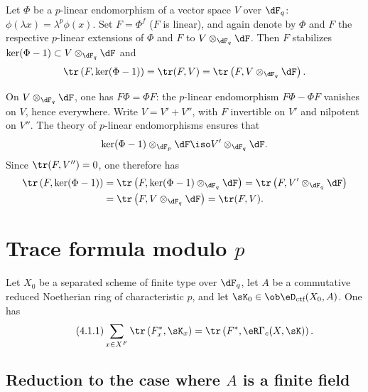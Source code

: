 \documentclass[oneside]{book}
\begin{document}
\begin{lemma_}\label{III:3-8}
Let $\Phi$ be a $p$-linear endomorphism of a vector space $V$ over
$\dF_q$: $\phi(\lambda x) = \lambda^p\phi(x)$. Set $F=\Phi^f$ ($F$ is
linear), and again denote by $\Phi$ and $F$ the respective $p$-linear
extensions of $\Phi$ and $F$ to $V\otimes_{\dF_q}\dF$. Then $F$ stabilizes
$\ker(\Phi-1)\subset V\otimes_{\dF_q}\dF$ and
\[
  \tr\left(F,\ker(\Phi-1)\right) = \tr(F,V) = \tr\left(F,V\otimes_{\dF_q}\dF\right) \text{.}
\]
\end{lemma_}

On $V\otimes_{\dF_q}\dF$, one has $F\Phi = \Phi F$: the $p$-linear
endomorphism $F\Phi-\Phi F$ vanishes on $V$, hence everywhere. Write
$V=V'+V''$, with $F$ invertible on $V'$ and nilpotent on $V''$. The theory
of $p$-linear endomorphisms ensures that
\[
  \ker(\Phi-1)\otimes_{\dF_p}\dF \iso V'\otimes_{\dF_q}\dF \text{.}
\]
Since $\tr(F,V'') = 0$, one therefore has
\begin{align*}
  \tr\left(F,\ker(\Phi-1)\right)
    &= \tr\left(F,\ker(\Phi-1)\otimes_{\dF_q}\dF\right) = \tr\left(F,V'\otimes_{\dF_q}\dF\right) \\
    &= \tr\left(F,V\otimes_{\dF_q}\dF\right) = \tr(F,V) \text{.}
\end{align*}











\section{Trace formula modulo \texorpdfstring{$p$}{p}}\label{III:4}






\begin{theorem_}\label{III:4-1}
Let $X_0$ be a separated scheme of finite type over $\dF_q$, let $A$ be a
commutative reduced Noetherian ring of characteristic $p$, and let
$\sK_0\in\ob\eD_\textnormal{ctf}(X_0,A)$. One has
\begin{equation*}\tag{4.1.1}\label{III:eq:4-1-1}
  \sum_{x\in X^F} \tr\left(F_x^*,\sK_x\right) = \tr\left(F^*,\eR\Gamma_c(X,\sK)\right) \text{.}
\end{equation*}
\end{theorem_}






\subsection{Reduction to the case where \texorpdfstring{$A$}{A} is a finite field}\label{III:4-2}
\end{document}
